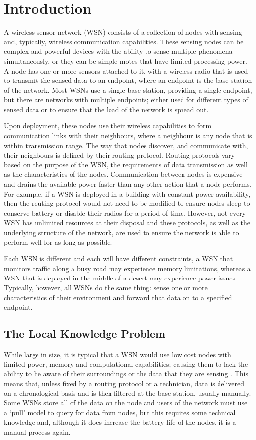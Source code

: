 \chapter{Introduction}
A wireless sensor network (WSN) consists of a collection of nodes with sensing and, typically, wireless communication capabilities. These sensing nodes can be complex and powerful devices with the ability to sense multiple phenomena simultaneously, or they can be simple motes that have limited processing power. A node has one or more sensors attached to it, with a wireless radio that is used to transmit the sensed data to an endpoint, where an endpoint is the base station of the network. Most WSNs use a single base station, providing a single endpoint, but there are networks with multiple endpoints; either used for different types of sensed data or to ensure that the load of the network is spread out.

Upon deployment, these nodes use their wireless capabilities to form communication links with their neighbours, where a neighbour is any node that is within transmission range. The way that nodes discover, and communicate with, their neighbours is defined by their routing protocol. Routing protocols vary based on the purpose of the WSN, the requirements of data transmission as well as the characteristics of the nodes. Communication between nodes is expensive and drains the available power faster than any other action that a node performs. For example, if a WSN is deployed in a building with constant power availability, then the routing protocol would not need to be modified to ensure nodes sleep to conserve battery or disable their radios for a period of time. However, not every WSN has unlimited resources at their disposal and these protocols, as well as the underlying structure of the network, are used to ensure the network is able to perform well for as long as possible.

Each WSN is different and each will have different constraints, a WSN that monitors traffic along a busy road may experience memory limitations, whereas a  WSN that is deployed in the middle of a desert may experience power issues. Typically, however, all WSNs do the same thing: sense one or more characteristics of their environment and forward that data on to a specified endpoint.

\section{The Local Knowledge Problem}
While large in size, it is typical that a WSN would use low cost nodes with limited power, memory and computational capabilities; causing them to lack the ability to be aware of their surroundings or the data that they are sensing \cite{Akyildiz2002}. This means that, unless fixed by a routing protocol or a technician, data is delivered on a chronological basis and is then filtered at the base station, usually manually. Some WSNs store all of the data on the node and users of the network must use a `pull' model to query for data from nodes, but this requires some technical knowledge and, although it does increase the battery life of the nodes, it is a manual process again.

